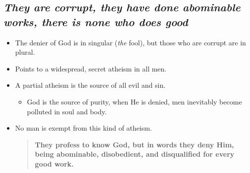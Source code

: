 \documentclass{article}
\newcommand{\BI}{\begin{itemize}\item}
\newcommand{\EI}{\end{itemize}}
\newcommand{\I}{\item}
\newcommand{\Q}[2]{\begin{quote} \textbf{#2 \center{#1}}\end{quote}}
\begin{document}
\subsection{\emph{They are corrupt, they have done abominable works,
            there is none who does good}}
\BI The denier of God is in singular (\emph{the} fool),
    but those who are corrupt are in plural.
\I  Points to a widespread, secret atheism in all men.
\I  A partial atheism is the source of all evil and sin.
    \BI God is the source of purity, when He is denied,
        men inevitably become polluted in soul and body. \EI
\I  No man is exempt from this kind of atheism.
    \Q{Titus 1:16}
    {They profess to know God, but in words they deny Him,
    being abominable, disobedient, and disqualified for 
    every good work.}
\EI
\end{document}
